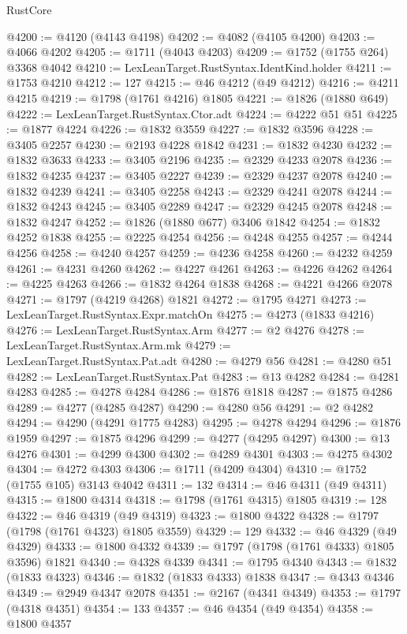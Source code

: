 \begin{lexlean}{RustCore}
\begin{coremodule}
@4200 := @4120 (@4143 @4198)
@4202 := @4082 (@4105 @4200)
@4203 := @4066 @4202
@4205 := @1711 (@4043 @4203)
@4209 := @1752 (@1755 @264) @3368 @4042
@4210 := LexLeanTarget.RustSyntax.IdentKind.holder
@4211 := @1753 @4210
@4212 := 127
@4215 := @46 @4212 (@49 @4212)
@4216 := @4211 @4215
@4219 := @1798 (@1761 @4216) @1805
@4221 := @1826 (@1880 @649)
@4222 := LexLeanTarget.RustSyntax.Ctor.adt
@4224 := @4222 @51 @51
@4225 := @1877 @4224
@4226 := @1832 @3559
@4227 := @1832 @3596
@4228 := @3405 @2257
@4230 := @2193 @4228 @1842
@4231 := @1832 @4230
@4232 := @1832 @3633
@4233 := @3405 @2196
@4235 := @2329 @4233 @2078
@4236 := @1832 @4235
@4237 := @3405 @2227
@4239 := @2329 @4237 @2078
@4240 := @1832 @4239
@4241 := @3405 @2258
@4243 := @2329 @4241 @2078
@4244 := @1832 @4243
@4245 := @3405 @2289
@4247 := @2329 @4245 @2078
@4248 := @1832 @4247
@4252 := @1826 (@1880 @677) @3406 @1842
@4254 := @1832 @4252 @1838
@4255 := @2225 @4254
@4256 := @4248 @4255
@4257 := @4244 @4256
@4258 := @4240 @4257
@4259 := @4236 @4258
@4260 := @4232 @4259
@4261 := @4231 @4260
@4262 := @4227 @4261
@4263 := @4226 @4262
@4264 := @4225 @4263
@4266 := @1832 @4264 @1838
@4268 := @4221 @4266 @2078
@4271 := @1797 (@4219 @4268) @1821
@4272 := @1795 @4271
@4273 := LexLeanTarget.RustSyntax.Expr.matchOn
@4275 := @4273 (@1833 @4216)
@4276 := LexLeanTarget.RustSyntax.Arm
@4277 := @2 @4276
@4278 := LexLeanTarget.RustSyntax.Arm.mk
@4279 := LexLeanTarget.RustSyntax.Pat.adt
@4280 := @4279 @56
@4281 := @4280 @51
@4282 := LexLeanTarget.RustSyntax.Pat
@4283 := @13 @4282
@4284 := @4281 @4283
@4285 := @4278 @4284
@4286 := @1876 @1818
@4287 := @1875 @4286
@4289 := @4277 (@4285 @4287)
@4290 := @4280 @56
@4291 := @2 @4282
@4294 := @4290 (@4291 @1775 @4283)
@4295 := @4278 @4294
@4296 := @1876 @1959
@4297 := @1875 @4296
@4299 := @4277 (@4295 @4297)
@4300 := @13 @4276
@4301 := @4299 @4300
@4302 := @4289 @4301
@4303 := @4275 @4302
@4304 := @4272 @4303
@4306 := @1711 (@4209 @4304)
@4310 := @1752 (@1755 @105) @3143 @4042
@4311 := 132
@4314 := @46 @4311 (@49 @4311)
@4315 := @1800 @4314
@4318 := @1798 (@1761 @4315) @1805
@4319 := 128
@4322 := @46 @4319 (@49 @4319)
@4323 := @1800 @4322
@4328 := @1797 (@1798 (@1761 @4323) @1805 @3559)
@4329 := 129
@4332 := @46 @4329 (@49 @4329)
@4333 := @1800 @4332
@4339 := @1797 (@1798 (@1761 @4333) @1805 @3596) @1821
@4340 := @4328 @4339
@4341 := @1795 @4340
@4343 := @1832 (@1833 @4323)
@4346 := @1832 (@1833 @4333) @1838
@4347 := @4343 @4346
@4349 := @2949 @4347 @2078
@4351 := @2167 (@4341 @4349)
@4353 := @1797 (@4318 @4351)
@4354 := 133
@4357 := @46 @4354 (@49 @4354)
@4358 := @1800 @4357

\end{coremodule}
\end{lexlean}
